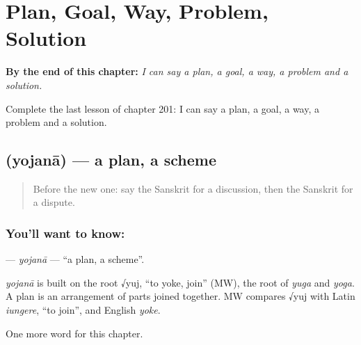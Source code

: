 
\chapter{Plan, Goal, Way, Problem, Solution}
\label{ch:sa-plan-goal-way-problem-solution}

\begin{chapteropening}
\textbf{By the end of this chapter:} \emph{I can say a plan, a goal, a way, a problem and a solution.}

Complete the last lesson of chapter 201: I can say a plan, a goal, a way, a problem and a solution.
\end{chapteropening}

\section[\texorpdfstring{\sk{योजना} (yojanā)}{योजना (yojanā)}]{ (yojanā) — a plan, a scheme}

\label{lesson:SA-C201-yojana}



\begin{quote}
Before the new one: say the Sanskrit for a discussion, then the Sanskrit for a dispute.
\end{quote}

\subsection*{You'll want to know: }
\textbf{} — \emph{yojanā} — \textquotedblleft{}a plan, a scheme\textquotedblright{}.

\begin{cousinweb}
\emph{yojanā} is built on the root √yuj, \textquotedblleft{}to yoke, join\textquotedblright{} (MW), the root of \emph{yuga} and \emph{yoga}. A plan is an arrangement of parts joined together. MW compares √yuj with Latin \emph{iungere}, \textquotedblleft{}to join\textquotedblright{}, and English \emph{yoke}.
\end{cousinweb}

\begin{grammarlens}[title={What you've built}]
One more word for this chapter.
\end{grammarlens}

